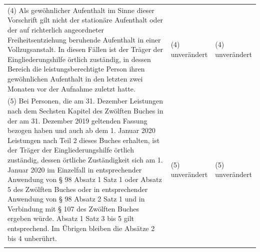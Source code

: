 \documentclass[10pt,a4paper,landscape]{article}
\begin{document}
\begin{longtable}{|L{8.2cm}|L{8.2cm}|L{8.2cm}|}
(4) Als gewöhnlicher Aufenthalt im Sinne  \newline dieser Vorschrift gilt nicht der stationäre  \newline Aufenthalt oder der auf richterlich  \newline angeordneter Freiheitsentziehung  \newline beruhende Aufenthalt in einer  \newline Vollzugsanstalt. In diesen Fällen ist der  \newline Träger der Eingliederungshilfe örtlich  \newline zuständig, in dessen Bereich die  \newline leistungsberechtigte Person ihren  \newline gewöhnlichen Aufenthalt in den letzten  \newline zwei Monaten vor der Aufnahme zuletzt  \newline hatte. & (4) unverändert & (4) unverändert \\
\hhline{|---|}
(5) Bei Personen, die am 31. Dezember   Leistungen nach dem Sechsten  \newline Kapitel des Zwölften Buches in der am 31.  \newline Dezember 2019 geltenden Fassung  \newline bezogen haben und auch ab dem 1.  \newline Januar 2020 Leistungen nach Teil 2 dieses  \newline Buches erhalten, ist der Träger der  \newline Eingliederungshilfe örtlich zuständig,  \newline dessen örtliche Zuständigkeit sich am 1.  \newline Januar 2020 im Einzelfall in  \newline entsprechender Anwendung von \S{} 98  \newline Absatz 1 Satz 1 oder Absatz 5 des  \newline Zwölften Buches oder in entsprechender  \newline Anwendung von \S{} 98 Absatz 2 Satz 1 und   in Verbindung mit \S{} 107 des Zwölften  \newline Buches ergeben würde. Absatz 1 Satz 3  \newline bis 5 gilt entsprechend. Im Übrigen bleiben  \newline die Absätze 2 bis 4 unberührt. & (5) unverändert & (5) unverändert \\
\hhline{|---|}
\end{longtable}
\newpage
\end{document}

